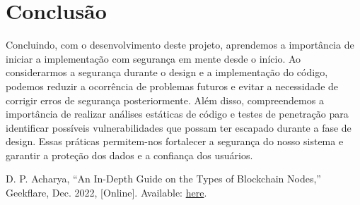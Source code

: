 \documentclass[conference]{IEEEtran}
\begin{document}
\section{Conclusão}
Concluindo, com o desenvolvimento deste projeto, aprendemos a importância de iniciar a implementação com segurança em mente desde o início. Ao considerarmos a segurança durante o design e a implementação do código, podemos reduzir a ocorrência de problemas futuros e evitar a necessidade de corrigir erros de segurança posteriormente. Além disso, compreendemos a importância de realizar análises estáticas de código e testes de penetração para identificar possíveis vulnerabilidades que possam ter escapado durante a fase de design. Essas práticas permitem-nos fortalecer a segurança do nosso sistema e garantir a proteção dos dados e a confiança dos usuários.

\begin{thebibliography}{1}
    D. P. Acharya, “An In-Depth Guide on the Types of Blockchain Nodes,” Geekflare, Dec. 2022, [Online]. Available: \href{https://geekflare.com/blockchain-nodes-guide/}{here}.




\end{thebibliography}
\end{document}
